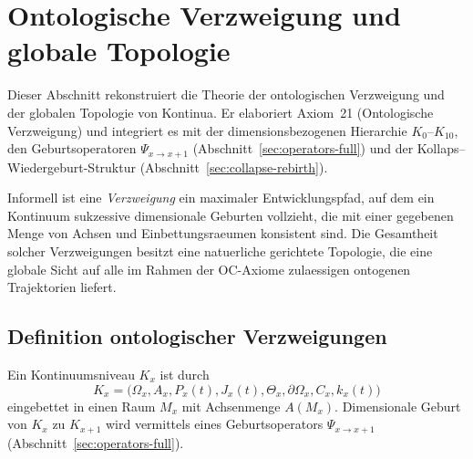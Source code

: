 
\section{Ontologische Verzweigung und globale Topologie}
\label{sec:branching-topology}

Dieser Abschnitt rekonstruiert die Theorie der ontologischen Verzweigung und der
globalen Topologie von Kontinua. Er elaboriert Axiom~21 (Ontologische Verzweigung)
und integriert es mit der dimensionsbezogenen Hierarchie \(K_0\)–\(K_{10}\), den
Geburtsoperatoren \(\Psi_{x\to x+1}\) (Abschnitt~\ref{sec:operators-full}) und der
Kollaps--Wiedergeburt-Struktur (Abschnitt~\ref{sec:collapse-rebirth}).

Informell ist eine \emph{Verzweigung} ein maximaler Entwicklungspfad, auf dem ein
Kontinuum sukzessive dimensionale Geburten vollzieht, die mit einer gegebenen
Menge von Achsen und Einbettungsraeumen konsistent sind. Die Gesamtheit
solcher Verzweigungen besitzt eine natuerliche gerichtete Topologie, die eine
globale Sicht auf alle im Rahmen der OC-Axiome zulaessigen ontogenen Trajektorien
liefert.

\subsection{Definition ontologischer Verzweigungen}

Ein Kontinuumsniveau \(K_x\) ist durch
\[
  K_x =
  \big(
    \Omega_x, A_x, P_x(t), J_x(t),
    \Theta_x, \partial\Omega_x, C_x, k_x(t)
  \big)
\]
eingebettet in einen Raum \(M_x\) mit Achsenmenge \(A(M_x)\). Dimensionale Geburt
von \(K_x\) zu \(K_{x+1}\) wird vermittels eines Geburtsoperators
\(\Psi_{x\to x+1}\) (Abschnitt~\ref{sec:operators-full}).

